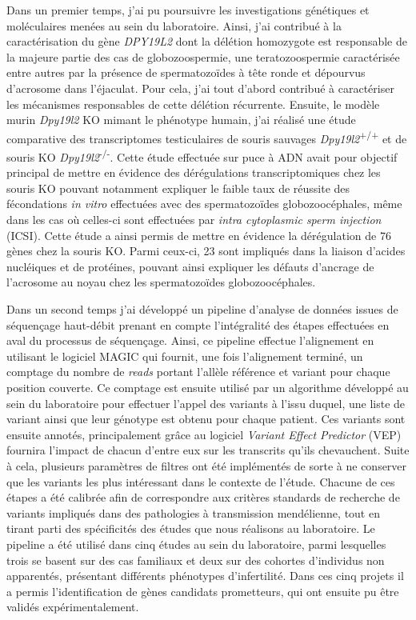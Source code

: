 \documentclass[12pt,twoside]{reedthesis}
\theoremstyle{definition}
\theoremstyle{definition}
\theoremstyle{remark}
\begin{document}
  Dans un premier temps, j'ai pu poursuivre les investigations génétiques
  et moléculaires menées au sein du laboratoire. Ainsi, j'ai contribué à
  la caractérisation du gène \emph{DPY19L2} dont la délétion homozygote
  est responsable de la majeure partie des cas de globozoospermie, une
  teratozoospermie caractérisée entre autres par la présence de
  spermatozoïdes à tête ronde et dépourvus d'acrosome dans l'éjaculat.
  Pour cela, j'ai tout d'abord contribué à caractériser les mécanismes
  responsables de cette délétion récurrente. Ensuite, le modèle murin
  \emph{Dpy19l2} KO mimant le phénotype humain, j'ai réalisé une étude
  comparative des transcriptomes testiculaires de souris sauvages
  \emph{Dpy19l2}\textsuperscript{+/+} et de souris KO
  \emph{Dpy19l2}\textsuperscript{-/-}. Cette étude effectuée sur puce à
  ADN avait pour objectif principal de mettre en évidence des
  dérégulations transcriptomiques chez les souris KO pouvant notamment
  expliquer le faible taux de réussite des fécondations \emph{in vitro}
  effectuées avec des spermatozoïdes globozoocéphales, même dans les cas
  où celles-ci sont effectuées par \emph{intra cytoplasmic sperm
  injection} (ICSI). Cette étude a ainsi permis de mettre en évidence la
  dérégulation de 76 gènes chez la souris KO. Parmi ceux-ci, 23 sont
  impliqués dans la liaison d'acides nucléiques et de protéines, pouvant
  ainsi expliquer les défauts d'ancrage de l'acrosome au noyau chez les
  spermatozoïdes globozoocéphales.
  
  Dans un second temps j'ai développé un pipeline d'analyse de données
  issues de séquençage haut-débit prenant en compte l'intégralité des
  étapes effectuées en aval du processus de séquençage. Ainsi, ce pipeline
  effectue l'alignement en utilisant le logiciel MAGIC qui fournit, une
  fois l'alignement terminé, un comptage du nombre de \emph{reads} portant
  l'allèle référence et variant pour chaque position couverte. Ce comptage
  est ensuite utilisé par un algorithme développé au sein du laboratoire
  pour effectuer l'appel des variants à l'issu duquel, une liste de
  variant ainsi que leur génotype est obtenu pour chaque patient. Ces
  variants sont ensuite annotés, principalement grâce au logiciel
  \emph{Variant Effect Predictor} (VEP) fournira l'impact de chacun
  d'entre eux sur les transcrits qu'ils chevauchent. Suite à cela,
  plusieurs paramètres de filtres ont été implémentés de sorte à ne
  conserver que les variants les plus intéressant dans le contexte de
  l'étude. Chacune de ces étapes a été calibrée afin de correspondre aux
  critères standards de recherche de variants impliqués dans des
  pathologies à transmission mendélienne, tout en tirant parti des
  spécificités des études que nous réalisons au laboratoire. Le pipeline a
  été utilisé dans cinq études au sein du laboratoire, parmi lesquelles
  trois se basent sur des cas familiaux et deux sur des cohortes
  d'individus non apparentés, présentant différents phénotypes
  d'infertilité. Dans ces cinq projets il a permis l'identification de
  gènes candidats prometteurs, qui ont ensuite pu être validés
  expérimentalement.
  
\end{document}
